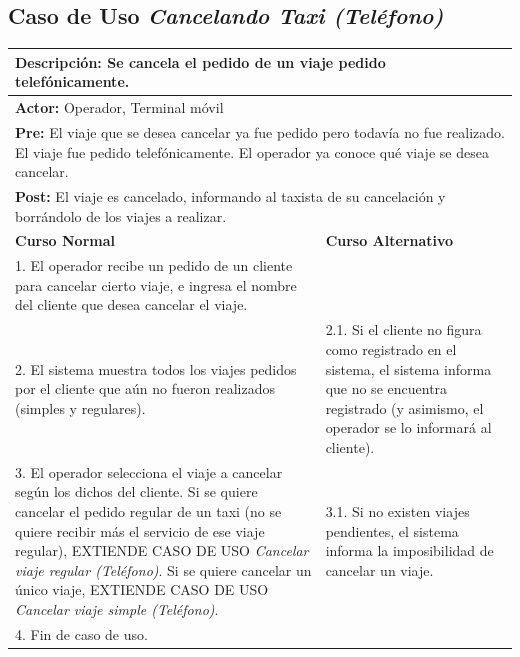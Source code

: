 \documentclass[a4paper]{article}
\begin{document}
\subsection{Caso de Uso \textit{Cancelando Taxi (Tel\'efono)}}
\begin{center}
\begin{tabular}{|p{10cm} | p{6cm}|}
\hline
\multicolumn{2}{|p{15cm}|}{\textbf{Descripci\'on:} Se cancela el pedido de un viaje pedido telef\'onicamente.} \\
\hline
\multicolumn{2}{|p{15cm}|}{\textbf{Actor:} Operador, Terminal m\'ovil} \\
\hline
\multicolumn{2}{|p{15cm}|}{\textbf{Pre:} El viaje que se desea cancelar ya fue pedido pero todav\'ia no fue realizado. El viaje fue pedido telef\'onicamente. El operador ya conoce qu\'e viaje se desea cancelar.} \\
\hline
\multicolumn{2}{|p{15cm}|}{\textbf{Post:} El viaje es cancelado, informando al taxista de su cancelaci\'on y borr\'andolo de los viajes a realizar.}\\
\hline
\textbf{Curso Normal}  & \textbf{Curso Alternativo} \\ \hline
1. El operador recibe un pedido de un cliente para cancelar cierto viaje, e ingresa el nombre del cliente que desea cancelar el viaje. & \\ \hline
2. El sistema muestra todos los viajes pedidos por el cliente que a\'un no fueron realizados (simples y regulares). & 2.1. Si el cliente no figura como registrado en el sistema, el sistema informa que no se encuentra registrado (y asimismo, el operador se lo informar\'a al cliente). \\ \hline
3. El operador selecciona el viaje a cancelar seg\'un los dichos del cliente. Si se quiere cancelar el pedido regular de un taxi (no se quiere recibir m\'as el servicio de ese viaje regular), EXTIENDE CASO DE USO \textit{Cancelar viaje regular (Tel\'efono)}. \newline Si se quiere cancelar un \'unico viaje, EXTIENDE CASO DE USO \textit{Cancelar viaje simple (Tel\'efono)}. & 3.1. Si no existen viajes pendientes, el sistema informa la imposibilidad de cancelar un viaje. \\ \hline %
4. Fin de caso de uso. & \\ \hline
\end{tabular}
\end{center}
\end{document}
